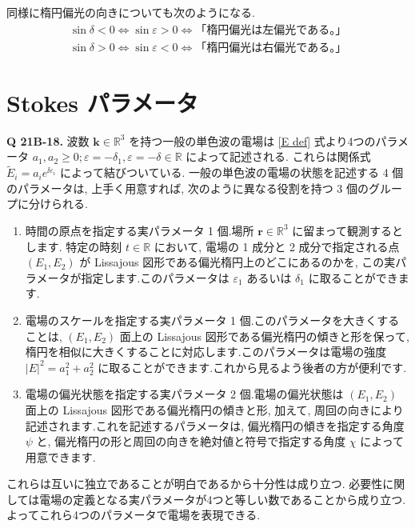 \documentclass[uplatex,dvipdfmx,a4paper,11pt]{jlreq}
\newcommand{\RR}{\mathbb{R}}
\newcommand{\rr}{\bm{r}}
\newcommand{\kk}{\bm{k}}
\theoremstyle{definition}
\begin{document}
同様に楕円偏光の向きについても次のようになる.
\begin{align}
  \sin\delta < 0 \iff \sin\varepsilon > 0 \iff \textrm{「楕円偏光は左偏光である。」} \\
  \sin\delta > 0 \iff \sin\varepsilon < 0 \iff \textrm{「楕円偏光は右偏光である。」}
\end{align}

\section{Stokes パラメータ}
\textbf{Q 21B-18.}
波数 $\kk\in\RR^3$ を持つ一般の単色波の電場は \eqref{E def} 式より4つのパラメータ $a_1, a_2 \geq 0; \varepsilon = -\delta_1, \varepsilon = -\delta\in\RR$ によって記述される. これらは関係式 $\tilde{E}_i = a_ie^{\ii \varepsilon_i}$ によって結びついている. 一般の単色波の電場の状態を記述する 4 個のパラメータは, 上手く用意すれば, 次のように異なる役割を持つ 3 個のグループに分けられる.

\begin{enumerate}
  \item 時間の原点を指定する実パラメータ 1 個.場所 $\rr\in\RR^3$ に留まって観測するとします. 特定の時刻 $t\in\RR$ において, 電場の 1 成分と 2 成分で指定される点 $(E_1, E_2)$ が Lissajous 図形である偏光楕円上のどこにあるのかを, この実パラメータが指定します.このパラメータは $\varepsilon_1$ あるいは $\delta_1$ に取ることができます.
  \item 電場のスケールを指定する実パラメータ 1 個.このパラメータを大きくすることは, $(E_1, E_2)$ 面上の Lissajous 図形である偏光楕円の傾きと形を保って, 楕円を相似に大きくすることに対応します.このパラメータは電場の強度 $|E|^2 = a_1^2 + a_2^2$ に取ることができます.これから見るよう後者の方が便利です.
  \item 電場の偏光状態を指定する実パラメータ 2 個.電場の偏光状態は $(E_1, E_2)$ 面上の Lissajous 図形である偏光楕円の傾きと形, 加えて, 周回の向きにより記述されます.これを記述するパラメータは, 偏光楕円の傾きを指定する角度 $\psi$ と, 偏光楕円の形と周回の向きを絶対値と符号で指定する角度 $\chi$ によって用意できます.
\end{enumerate}

これらは互いに独立であることが明白であるから十分性は成り立つ. 必要性に関しては電場の定義となる実パラメータが4つと等しい数であることから成り立つ. よってこれら4つのパラメータで電場を表現できる.
\end{document}
